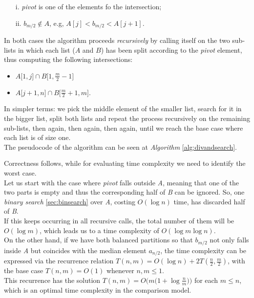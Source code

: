\begin{itemize}
    \item[i.] \textit{pivot} is one of the elements fo the intersection;
    \item[ii.] $b_{m/2} \notin A$, e.g, $A[j]<b_{m/2}<A[j+1]$.
\end{itemize}

In both cases the algorithm proceeds \textit{recursively} by calling itself on the two sub-lists in which each list ($A$ and $B$) has been split according to the \textit{pivot} element, thus computing the following intersections:

\begin{itemize}
    \item $A\big[1, j\big] \cap B\big[1, \frac{m}{2}-1\big]$
    \item $A\big[ j+1, n\big] \cap B\big[\frac{m}{2}+1, m\big]$.
\end{itemize}

In simpler terms: we pick the middle element of the smaller list, search for it in the bigger list, split both lists and repeat the process recursively on the remaining sub-lists, then again, then again, then again, until we reach the base case where each list is of size one.\\
The pseudocode of the algorithm can be seen at \textit{Algorithm} \ref{alg:divandsearch}.

Correctness follows, while for evaluating time complexity we need to identify the worst case. \\
Let us start with the case where \textit{pivot} falls outside \textit{A}, meaning that one of the two parts is empty and thus the corresponding half of \textit{B} can be ignored. So, one \textit{binary search} \ref{sec:binsearch} over \textit{A}, costing $O(\log n)$ time, has discarded half of \textit{B}.\\
If this keeps occurring in all recursive calls, the total number of them will be $O(\log m)$, which leads us to a time complexity of $O(\log m \log n)$.\\
On the other hand, if we have both balanced partitions so that $b_{m/2}$ not only falls inside \textit{A} but coincides with the median element $a_{n/2}$, the time complexity can be expressed via the recurrence relation $T(n, m) = O(\log n) + 2T \left(\frac{n}{2}, \frac{m}{2}\right)$, with the base case $T(n,m)=O(1)$ whenever $n,m \leq 1$.\\
This recurrence has the solution $T(n,m)=O \big(m \big(1+\log \frac{n}{m}\big)\big)$ for each $m \leq n$, which is an optimal time complexity in the comparison model.

